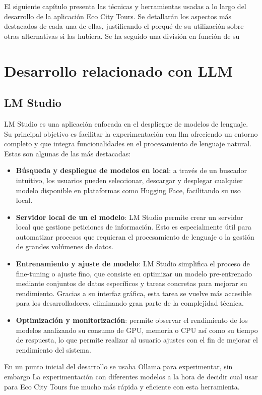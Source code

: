
El siguiente capítulo presenta las técnicas y herramientas usadas a lo largo del desarrollo de la aplicación Eco City Tours. Se detallarán los aspectos más destacados de cada una de ellas, justificando el porqué de su utilización sobre otras alternativas si las hubiera. Se ha seguido una división en función de su 


\section{Desarrollo relacionado con LLM}
	\subsection{LM Studio}
	LM Studio es una aplicación enfocada en el despliegue de modelos de lenguaje. Su principal objetivo es facilitar la experimentación con \acrlong{llm} ofreciendo un entorno completo y que integra funcionalidades en el procesamiento de lenguaje natural.
	Estas son algunas de las más destacadas:
	
	
	\begin{itemize}
		
		\item \textbf{Búsqueda y despliegue de modelos en local}: a través de un buscador intuitivo, los usuarios pueden seleccionar, descargar y desplegar cualquier modelo disponible en plataformas como Hugging Face, facilitando su uso local.
		
		\item \textbf{Servidor local de un el modelo}: LM Studio permite crear un servidor local que gestione peticiones de información. Esto es especialmente útil para automatizar procesos que requieran el procesamiento de lenguaje o la gestión de grandes volúmenes de datos.
		
		\item \textbf{Entrenamiento y ajuste de modelo}: LM Studio simplifica el proceso de fine-tuning o ajuste fino, que consiste en optimizar un modelo pre-entrenado mediante conjuntos de datos específicos y tareas concretas para mejorar su rendimiento. Gracias a su interfaz gráfica, esta tarea se vuelve más accesible para los desarrolladores, eliminando gran parte de la complejidad técnica.
		
		\item \textbf{Optimización y monitorización}: permite observar el rendimiento de los modelos analizando su consumo de GPU, memoria o CPU así como su tiempo de respuesta, lo que permite realizar al usuario ajustes con el fin de mejorar el rendimiento del sistema.
		
	\end{itemize}
	En un punto inicial del desarrollo se usaba Ollama para experimentar, sin embargo
	La experimentación con diferentes modelos a la hora de decidir cual usar para Eco City Tours fue mucho más rápida y eficiente con esta herramienta.
	
